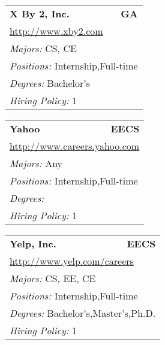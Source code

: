 \documentclass[twoside]{article}
\begin{document}
\begin{center}
\begin{multicols}{3}
\begin{FlushLeft}
\begin{minipage}{\columnwidth}
\end{minipage}
 
\begin{minipage}{\columnwidth}\begin{tabularx}{.95\columnwidth}{Xr}
                 {\Large\bf X By 2, Inc.} & {\Large\bf GA}\\
    \multicolumn{2}{p{.95\columnwidth}}{\url{http://www.xby2.com}}\\
    \multicolumn{2}{p{.95\columnwidth}}{\emph{Majors:} CS, CE}\\
    \multicolumn{2}{p{.95\columnwidth}}{\emph{Positions:} Internship,Full-time}\\
    \multicolumn{2}{p{.95\columnwidth}}{\emph{Degrees:} Bachelor's}\\
    \multicolumn{2}{p{.95\columnwidth}}{\emph{Hiring Policy:} 1}\\
    \end{tabularx}
    
\end{minipage}
 
\begin{minipage}{\columnwidth}\begin{tabularx}{.95\columnwidth}{Xr}
                 {\Large\bf Yahoo} & {\Large\bf EECS}\\
    \multicolumn{2}{p{.95\columnwidth}}{\url{http://www.careers.yahoo.com}}\\
    \multicolumn{2}{p{.95\columnwidth}}{\emph{Majors:} Any}\\
    \multicolumn{2}{p{.95\columnwidth}}{\emph{Positions:} Internship,Full-time}\\
    \multicolumn{2}{p{.95\columnwidth}}{\emph{Degrees:} }\\
    \multicolumn{2}{p{.95\columnwidth}}{\emph{Hiring Policy:} 1}\\
    \end{tabularx}
    
\end{minipage}
 
\begin{minipage}{\columnwidth}\begin{tabularx}{.95\columnwidth}{Xr}
                 {\Large\bf Yelp, Inc.} & {\Large\bf EECS}\\
    \multicolumn{2}{p{.95\columnwidth}}{\url{http://www.yelp.com/careers}}\\
    \multicolumn{2}{p{.95\columnwidth}}{\emph{Majors:} CS, EE, CE}\\
    \multicolumn{2}{p{.95\columnwidth}}{\emph{Positions:} Internship,Full-time}\\
    \multicolumn{2}{p{.95\columnwidth}}{\emph{Degrees:} Bachelor's,Master's,Ph.D.}\\
    \multicolumn{2}{p{.95\columnwidth}}{\emph{Hiring Policy:} 1}\\
    \end{tabularx}
    

\end{minipage}
\end{FlushLeft}
\end{multicols}
\end{center}
\end{document}
